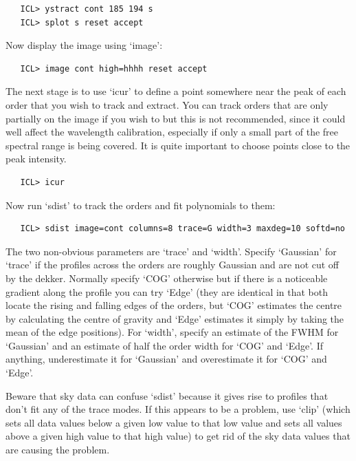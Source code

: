 \documentclass[11pt,twoside]{article}
\begin{document}
\begin{verbatim}
   ICL> ystract cont 185 194 s
   ICL> splot s reset accept
\end{verbatim}

   Now display the image using `image':

\begin{verbatim}
   ICL> image cont high=hhhh reset accept
\end{verbatim}

   The next stage is to use `icur' to define a point somewhere near the
   peak of each order that you wish to track and extract. You can track
   orders that are only partially on the image if you wish to but this
   is not recommended, since it could well affect the wavelength
   calibration, especially if only a small part of the free spectral
   range is being covered. It is quite important to choose points close
   to the peak intensity.

\begin{verbatim}
   ICL> icur
\end{verbatim}

   Now run `sdist' to track the orders and fit polynomials to them:

\begin{verbatim}
   ICL> sdist image=cont columns=8 trace=G width=3 maxdeg=10 softd=no
\end{verbatim}

   The two non-obvious parameters are `trace' and `width'. Specify
   `Gaussian' for `trace' if the profiles across the orders are roughly
   Gaussian and are not cut off by the dekker. Normally specify `COG'
   otherwise but if there is a noticeable gradient along the profile you
   can try `Edge' (they are identical in that both locate the rising and
   falling edges of the orders, but `COG' estimates the centre by
   calculating the centre of gravity and `Edge' estimates it simply by
   taking the mean of the edge positions). For `width', specify an
   estimate of the FWHM for `Gaussian' and an estimate of half the order
   width for `COG' and `Edge'. If anything, underestimate it for
   `Gaussian' and overestimate it for `COG' and `Edge'.

   Beware that sky data can confuse `sdist' because it gives rise to
   profiles that don't fit any of the trace modes. If this appears to be
   a problem, use `clip' (which sets all data values below a given low
   value to that low value and sets all values above a given high value
   to that high value) to get rid of the sky data values that are
   causing the problem.
\end{document}
